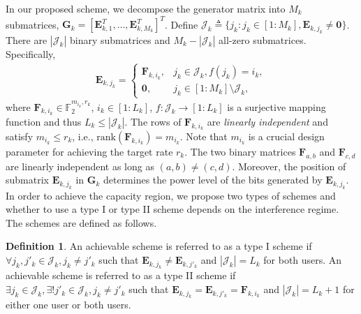 \documentclass[12pt, draftclsnofoot, onecolumn]{IEEEtran}
\theoremstyle{definition}
\newtheorem{define}{Definition}
\begin{document}
In our proposed scheme, we decompose the generator matrix into $M_k$ submatrices, $\boldsymbol{G}_k = [\boldsymbol{E}^T_{k,1},\ldots,\boldsymbol{E}^T_{k,M_k}]^T$. Define $\mathcal{J}_k \triangleq \{j_k:j_k \in [1:M_k],\boldsymbol{E}_{k,j_k} \neq \boldsymbol{0}\}$. There are $|\mathcal{J}_k|$ binary submatrices and $M_k-|\mathcal{J}_k|$ all-zero submatrices. Specifically,
\begin{align}\label{eq:EK}
\boldsymbol{E}_{k,j_k} = \left\{\begin{array}{ll} \boldsymbol{F}_{k,i_k},& j_k \in \mathcal{J}_k,f(j_k)=i_k,\\
\mathbf{0} ,& j_k \in [1:M_k] \setminus \mathcal{J}_k,
\end{array}\right.
\end{align}
where $\boldsymbol{F}_{k,i_k} \in \mathbb{F}_2^{m_{i_k},r_k}$, $i_k \in [1:L_k]$, $f:\mathcal{J}_k \rightarrow [1:L_k]$ is a surjective mapping function and thus $L_k \leq |\mathcal{J}_k|$. The rows of $\boldsymbol{F}_{k,i_k}$ are \emph{linearly independent} and satisfy $m_{i_k} \leq r_k$, i.e., $\text{rank}(\boldsymbol{F}_{k,i_k})=m_{i_k}$. Note that $m_{i_k}$ is a crucial design parameter for achieving the target rate $r_k$. The two binary matrices $\boldsymbol{F}_{a,b}$ and $\boldsymbol{F}_{c,d}$ are linearly independent as long as $(a,b) \neq (c,d)$. Moreover, the position of submatrix $\boldsymbol{E}_{k,j_k}$ in $\boldsymbol{G}_k$ determines the power level of the bits generated by $\boldsymbol{E}_{k,j_k}$. In order to achieve the capacity region, we propose two types of schemes and whether to use a type I or type II scheme depends on the interference regime. The schemes are defined as follows.


\begin{define}\label{def_type12}
An achievable scheme is referred to as a type I scheme if $\forall j_k,j'_k\in \mathcal{J}_k,j_k \neq j'_k$ such that $\boldsymbol{E}_{k,j_k}\neq \boldsymbol{E}_{k,j'_k}$ and $|\mathcal{J}_k|=L_k$ for both users. An achievable scheme is referred to as a type II scheme if $ \exists j_k \in \mathcal{J}_k, \exists ! j'_k \in \mathcal{J}_k,j_k\neq j'_k$ such that $\boldsymbol{E}_{k,j_k}=\boldsymbol{E}_{k,j'_k}=\boldsymbol{F}_{k,i_k}$ and $|\mathcal{J}_k|=L_k+1$ for either one user or both users.
\end{define}
\end{document}
